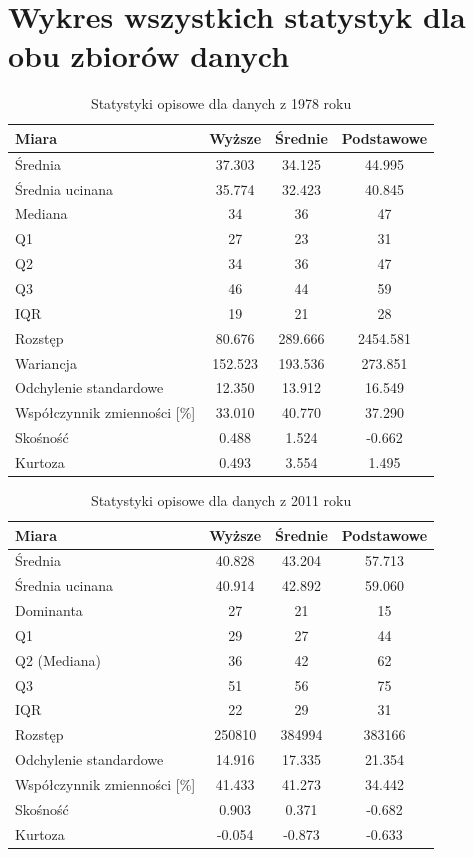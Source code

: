 \documentclass[15pt]{article}
\begin{document}
\section{Wykres wszystkich statystyk dla obu zbiorów danych}

\begin{table}[H]
	\centering
	\caption{Statystyki opisowe dla danych z 1978 roku}
	\label{tab:1978}
	\small
	\begin{tabular}{lccc}
		\toprule
		\textbf{Miara} & \textbf{Wyższe} & \textbf{Średnie} & \textbf{Podstawowe} \\
		\midrule
		Średnia & 37.303 & 34.125 & 44.995 \\
		Średnia ucinana & 35.774 & 32.423 & 40.845 \\
		Mediana & 34 & 36 & 47 \\
		Q1 & 27 & 23 & 31 \\
		Q2 & 34 & 36 & 47 \\
		Q3 & 46 & 44 & 59 \\
		IQR & 19 & 21 & 28 \\
		Rozstęp & 80.676 & 289.666 & 2454.581 \\
		Wariancja & 152.523 & 193.536 & 273.851 \\
		Odchylenie standardowe & 12.350 & 13.912 & 16.549 \\
		Współczynnik zmienności [\%] & 33.010 & 40.770 & 37.290 \\
		Skośność & 0.488 & 1.524 & -0.662 \\
		Kurtoza & 0.493 & 3.554 & 1.495 \\
		\bottomrule
	\end{tabular}
\end{table}

\begin{table}[H]
	\centering
	\caption{Statystyki opisowe dla danych z 2011 roku}
	\label{tab:2011}
	\small
	\begin{tabular}{lccc}
		\toprule
		\textbf{Miara} & \textbf{Wyższe} & \textbf{Średnie} & \textbf{Podstawowe} \\
		\midrule
		Średnia & 40.828 & 43.204 & 57.713 \\
		Średnia ucinana & 40.914 & 42.892 & 59.060 \\
		Dominanta & 27 & 21 & 15 \\
		Q1 & 29 & 27 & 44 \\
		Q2 (Mediana) & 36 & 42 & 62 \\
		Q3 & 51 & 56 & 75 \\
		IQR & 22 & 29 & 31 \\
		Rozstęp & 250810 & 384994 & 383166 \\
		Odchylenie standardowe & 14.916 & 17.335 & 21.354 \\
		Współczynnik zmienności [\%] & 41.433 & 41.273 & 34.442 \\
		Skośność & 0.903 & 0.371 & -0.682 \\
		Kurtoza & -0.054 & -0.873 & -0.633 \\
		\bottomrule
	\end{tabular}
\end{table}
\end{document}
